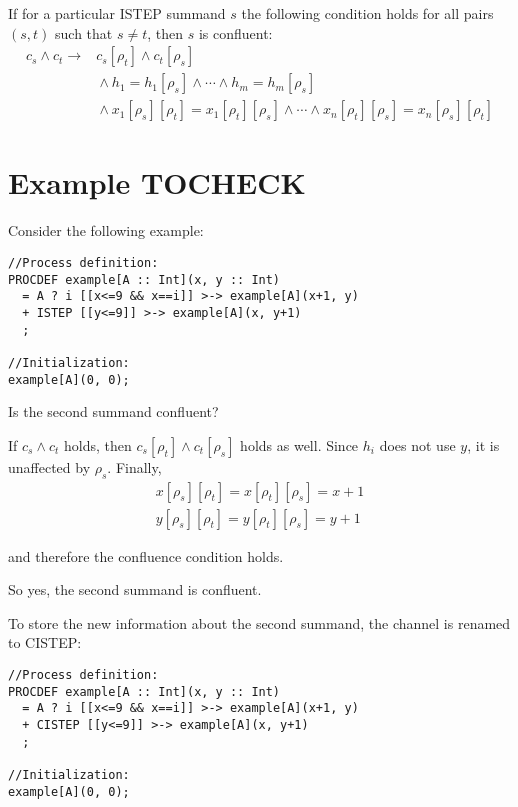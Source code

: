 If for a particular ISTEP summand $s$ the following condition holds for all pairs $(s, t)$ such that $s \neq t$, then $s$ is confluent:
\begin{align*}
c_s \land c_t \rightarrow{} &c_s[\rho_t] \land c_t[\rho_s] \\
&{} \land h_1 = h_1[\rho_s] \land \cdots{} \land h_m = h_m[\rho_s] \\
&{} \land x_1[\rho_s][\rho_t] = x_1[\rho_t][\rho_s] \land \cdots{} \land x_n[\rho_t][\rho_s] = x_n[\rho_s][\rho_t]
\end{align*}

\section{Example TOCHECK}

Consider the following example:

\begin{lstlisting}
//Process definition:
PROCDEF example[A :: Int](x, y :: Int)
  = A ? i [[x<=9 && x==i]] >-> example[A](x+1, y)
  + ISTEP [[y<=9]] >-> example[A](x, y+1)
  ;

//Initialization:
example[A](0, 0);
\end{lstlisting}

Is the second summand confluent?

If $c_s \land c_t$ holds, then $c_s[\rho_t] \land c_t[\rho_s]$ holds as well.
Since $h_i$ does not use $y$, it is unaffected by $\rho_s$.
Finally,
\begin{align*}
x[\rho_s][\rho_t] = x[\rho_t][\rho_s] = x+1 \\
y[\rho_s][\rho_t] = y[\rho_t][\rho_s] = y+1
\end{align*}

and therefore the confluence condition holds.

So yes, the second summand is confluent.

To store the new information about the second summand, the channel is renamed to CISTEP:

\begin{lstlisting}
//Process definition:
PROCDEF example[A :: Int](x, y :: Int)
  = A ? i [[x<=9 && x==i]] >-> example[A](x+1, y)
  + CISTEP [[y<=9]] >-> example[A](x, y+1)
  ;

//Initialization:
example[A](0, 0);
\end{lstlisting}


